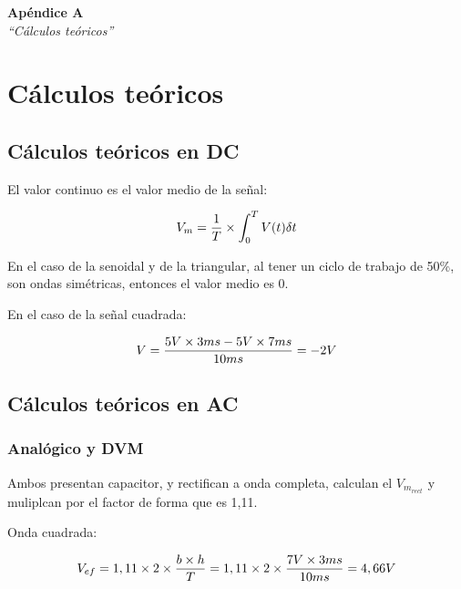 \documentclass{article}
\begin{document}

\newpage
\vspace*{4cm}
\begin{center}
	\textbf{\Huge{Apéndice A}} \\
	\bigskip\bigskip
	\Large{\textit{``Cálculos teóricos''}}
\end{center}


\newpage
\section{Cálculos teóricos}
\bigskip

\subsection{Cálculos teóricos en DC}

El valor continuo es el valor medio de la señal:

\begin{center}
\begin{equation}
V_{m} =  {{1}\over{T}} \times \int_{0}^{T} {V(t)} \delta t
\end{equation}
\end{center}
\bigskip

En el caso de la senoidal y de la triangular, al tener un ciclo de trabajo de 50\%, son ondas simétricas, entonces el valor medio es 0.

En el caso de la señal cuadrada:

\begin{center}
\begin{equation}
V =  {5V \times 3ms - 5V \times 7ms \over 10ms }= -2V
\end{equation}
\end{center}
\bigskip


\subsection{Cálculos teóricos en AC}

\subsubsection{Analógico y DVM}

Ambos presentan capacitor, y rectifican a onda completa, calculan el $V_{m_{rect}}$ y muliplcan por el factor de forma que es 1,11.

Onda cuadrada:

\begin{center}
\begin{equation}
V_{ef} = 1,11 \times 2 \times {b \times h \over T} = 1,11 \times 2 \times {7V \times 3ms \over 10ms} = 4,66V
\end{equation}
\end{center}
\medskip
\end{document}
